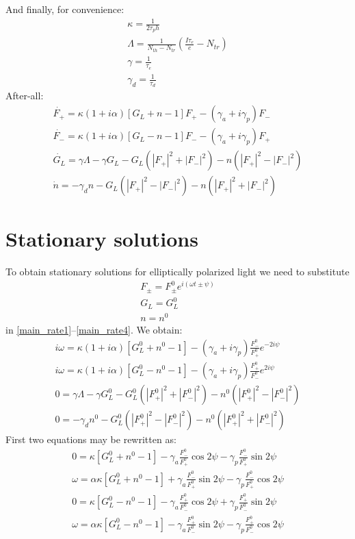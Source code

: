\documentclass[12pt, notitlepage]{report}
\begin{document}
	And finally, for convenience:
	\begin{gather}
		\kappa = \frac{1}{2\tau_ph}\\
		\Lambda = \frac{1}{N_{th} - N_{tr}}\left(\frac{I\tau_e}{e}-N_{tr}\right)\\
		\gamma = \frac{1}{\tau_e}\\
		\gamma_d = \frac{1}{\tau_d}
	\end{gather} 
	After-all: 
		\begin{gather}
			\label{main_rate1}
		\dot{F_+} = \kappa(1+i\alpha)\left[G_L+ n - 1\right] F_+ - (\gamma_a + i\gamma_p) F_- \\
		\dot{F_-} = \kappa(1+i\alpha)\left[G_L- n - 1\right] F_- - (\gamma_a + i\gamma_p) F_+ \\
		\dot{G_L} = \gamma\Lambda - \gamma G_L - G_L(|F_+|^2+|F_-|^2) - n(|F_+|^2 - |F_-|^2) \\
		\label{main_rate4}
		\dot{n} = -\gamma_d n - G_L(|F_+|^2-|F_-|^2) - n(|F_+|^2+|F_-|^2)
	\end{gather}

	\section{Stationary solutions}
	To obtain stationary solutions for elliptically polarized light we need to substitute
	\begin{gather*}
		F_\pm = F^0_\pm e^{i(\omega t \pm \psi)}\\
		G_L = G_L^0\\
		n = n^0
	\end{gather*}
	in \eqref{main_rate1}--\eqref{main_rate4}. We obtain:
	\begin{gather}
		\label{stat1}
		i\omega = \kappa(1+i\alpha)\left[G^0_L+ n^0 - 1\right] - (\gamma_a + i\gamma_p) \frac{F^0_-}{F^0_+} e^{- 2i\psi} \\
		\label{stat2}
		i\omega = \kappa(1+i\alpha)\left[G^0_L- n^0 - 1\right] - (\gamma_a + i\gamma_p) \frac{F^0_+}{F^0_-} e^{2i\psi} \\
		\label{stat3}
		0 = \gamma\Lambda - \gamma G^0_L - G^0_L(|F^0_+|^2+|F^0_-|^2) - n^0(|F^0_+|^2 - |F^0_-|^2) \\
		\label{stat4}
		0 = -\gamma_d n^0 - G^0_L(|F^0_+|^2-|F^0_-|^2) - n^0(|F^0_+|^2+|F^0_-|^2)
	\end{gather}
First two equations may be rewritten as:
\begin{gather}
	\label{statir1}
	0 = \kappa \left[G^0_L+ n^0 - 1\right] - \gamma_a \frac{F^0_-}{F^0_+} \cos 2\psi - \gamma_p \frac{F^0_-}{F^0_+} \sin 2\psi \\
	\omega = \alpha\kappa \left[G^0_L+ n^0 - 1\right] + \gamma_a \frac{F^0_-}{F^0_+} \sin 2\psi - \gamma_p \frac{F^0_-}{F^0_+} \cos 2\psi \\
	0 = \kappa \left[G^0_L- n^0 - 1\right] - \gamma_a \frac{F^0_+}{F^0_-} \cos 2\psi + \gamma_p \frac{F^0_+}{F^0_-} \sin 2\psi \\
	\label{statir4}
	\omega = \alpha\kappa \left[G^0_L- n^0 - 1\right] - \gamma_a \frac{F^0_+}{F^0_-} \sin 2\psi - \gamma_p \frac{F^0_+}{F^0_-} \cos 2\psi
\end{gather}
\end{document}
